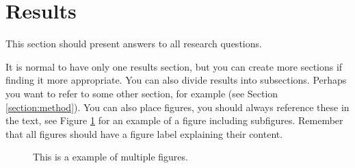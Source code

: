 \section{Results}
\label{section:results}
This section should present answers to all research questions.

It is normal to have only one results section, but you can create more sections if finding it more appropriate. You can also divide results into subsections. Perhaps you want to refer to some other section, for example (see Section \ref{section:method}). You can also place figures, you should always reference these in the text, see Figure \ref{fig:MDHlogga} for an example of a figure including subfigures. Remember that all figures should have a figure label explaining their content.


\begin{figure}[H]
    \centering
    \qquad
    \qquad
    \caption[Short text]{This is a example of multiple figures.}
    \label{fig:MDHlogga}
\end{figure}